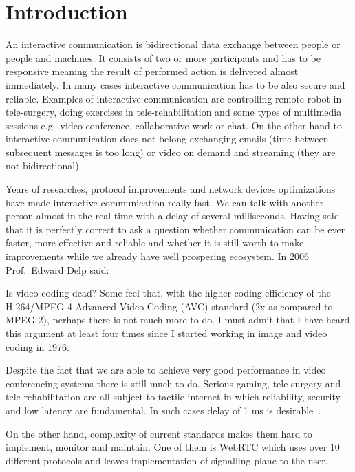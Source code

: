 \section{Introduction}
\label{sec:introduction}

An interactive communication is bidirectional data exchange between people or people and machines.
It consists of two or more participants and has to be responsive meaning the result of performed action is delivered almost immediately.
In many cases interactive communication has to be also secure and reliable.
Examples of interactive communication are controlling remote robot in tele-surgery, doing exercises in tele-rehabilitation and
some types of multimedia sessions e.g.\ video conference, collaborative work or chat.
On the other hand to interactive communication does not belong exchanging emails (time between subsequent messages is too long) or
video on demand and streaming (they are not bidirectional).

Years of researches, protocol improvements and network devices optimizations have made interactive communication really fast.
We can talk with another person almost in the real time with a delay of several milliseconds.
Having said that it is perfectly correct to ask a question whether communication can be even faster, more effective and reliable and whether it is still worth to make improvements while we already have well prospering ecosystem.
In 2006 Prof.\ Edward Delp said:
\begin{displayquote}
    Is video coding dead?
    Some feel that, with the higher coding efficiency of the H.264/MPEG-4 Advanced Video Coding (AVC) standard (2x as compared to MPEG-2), perhaps there is not much more to do.
    I must admit that I have heard this  argument at least four times since I started working in image and video coding in 1976.\cite{4015574}
\end{displayquote}
Despite the fact that we are able to achieve very good performance in video conferencing systems there is still much to do.
Serious gaming, tele-surgery and tele-rehabilitation are all subject to tactile internet in which reliability, security and low latency are fundamental.
In such cases delay of 1 ms is desirable~\cite{the-tactile-internet}.

On the other hand, complexity of current standards makes them hard to implement, monitor and maintain.
One of them is WebRTC which uses over 10 different protocols and leaves implementation of signalling plane to the user.

